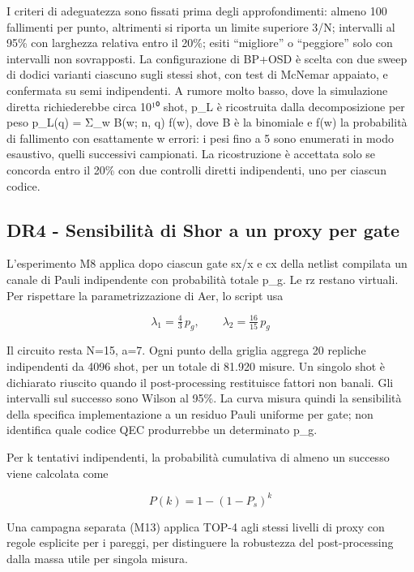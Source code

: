 I criteri di adeguatezza sono fissati prima degli approfondimenti: almeno 100 fallimenti per punto, altrimenti si riporta un limite superiore 3/N; intervalli al 95\% con larghezza relativa entro il 20\%; esiti ``migliore'' o ``peggiore'' solo con intervalli non sovrapposti. La configurazione di BP+OSD è scelta con due sweep di dodici varianti ciascuno sugli stessi shot, con test di McNemar appaiato, e confermata su semi indipendenti. A rumore molto basso, dove la simulazione diretta richiederebbe circa 10¹⁰ shot, p\_L è ricostruita dalla decomposizione per peso p\_L(q) = Σ\_w B(w; n, q) f(w), dove B è la binomiale e f(w) la probabilità di fallimento con esattamente w errori: i pesi fino a 5 sono enumerati in modo esaustivo, quelli successivi campionati. La ricostruzione è accettata solo se concorda entro il 20\% con due controlli diretti indipendenti, uno per ciascun codice.

\subsection{DR4 - Sensibilità di Shor a un proxy per gate}\label{sec:finale_3_5_5}

L'esperimento M8 applica dopo ciascun gate sx/x e cx della netlist compilata un canale di Pauli indipendente con probabilità totale p\_g. Le rz restano virtuali. Per rispettare la parametrizzazione di Aer, lo script usa

\begin{equation*}
  \lambda_1 = \tfrac{4}{3}\,p_g, \qquad \lambda_2 = \tfrac{16}{15}\,p_g \tag{3.7}
\end{equation*}

Il circuito resta N=15, a=7. Ogni punto della griglia aggrega 20 repliche indipendenti da 4096 shot, per un totale di 81.920 misure. Un singolo shot è dichiarato riuscito quando il post-processing restituisce fattori non banali. Gli intervalli sul successo sono Wilson al 95\%. La curva misura quindi la sensibilità della specifica implementazione a un residuo Pauli uniforme per gate; non identifica quale codice QEC produrrebbe un determinato p\_g.

Per k tentativi indipendenti, la probabilità cumulativa di almeno un successo viene calcolata come

\begin{equation*}
  P(k) = 1 - (1 - P_s)^k \tag{3.8}
\end{equation*}

Una campagna separata (M13) applica TOP-4 agli stessi livelli di proxy con regole esplicite per i pareggi, per distinguere la robustezza del post-processing dalla massa utile per singola misura.

